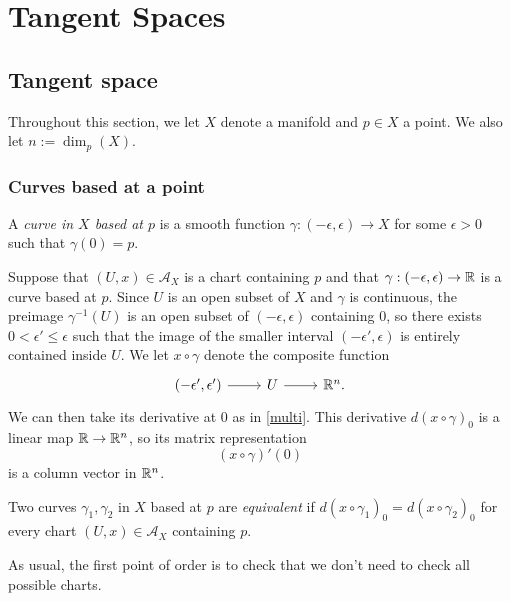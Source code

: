 \chapter{Tangent Spaces}

\section{Tangent space}

Throughout this section, we let $X$ denote a manifold and $p \in X$ a point. We also let $n := \dim_p(X)$. 

\subsection{Curves based at a point}

\begin{definition} 
	A \emph{curve in $X$ based at $p$} is a smooth function $\gamma : (-\epsilon, \epsilon) \to X$ for some $\epsilon > 0$ such that $\gamma(0) = p$. 
\end{definition}

Suppose that $(U, x) \in \mathscr{A}_X$ is a chart containing $p$ and that $\gamma : (-\epsilon, \epsilon) \to \mathbb{R}$ is a curve based at $p$. Since $U$ is an open subset of $X$ and $\gamma$ is continuous, the preimage $\gamma^{-1}(U)$ is an open subset of $(-\epsilon, \epsilon)$ containing 0, so there exists $0 < \epsilon' \leq \epsilon$ such that the image of the smaller interval $(-\epsilon', \epsilon)$ is entirely contained inside $U$. We let $x \circ \gamma$ denote the composite function 
\[ \begin{tikzcd} (-\epsilon', \epsilon') \ar{r} & U \ar{r} & \R^n. \end{tikzcd} \]
We can then take its derivative at $0$ as in \cref{multi}. This derivative $d(x \circ \gamma)_0$ is a linear map $\mathbb{R} \to \mathbb{R}^n$, so its matrix representation \[ (x \circ \gamma)'(0) \] is a column vector in $\mathbb{R}^n$.

\begin{definition} \label{equivalent-curves} 
	Two curves $\gamma_1, \gamma_2$ in $X$ based at $p$ are \emph{equivalent} if $d(x \circ \gamma_1)_0 = d(x \circ \gamma_2)_0$ for every chart $(U, x) \in \mathscr{A}_X$ containing $p$. 
\end{definition}

As usual, the first point of order is to check that we don't need to check all possible charts. 

